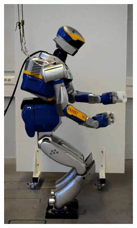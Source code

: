 \begin{figure}
\begin{subfigure}{0.19\columnwidth}
    \includegraphics[width = \columnwidth]
                    {src/chap3-optimal-motion-planning/figure/self-collision-8.png}
    \label{self-collision-8}
  \end{subfigure}
  \begin{subfigure}{0.19\columnwidth}
    \centering

\end{subfigure}
\end{figure}
